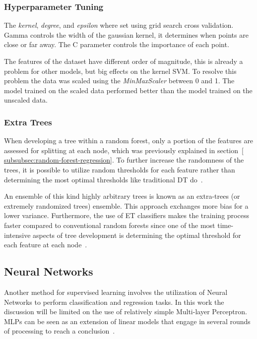 \subsubsection*{Hyperparameter Tuning}
The \textit{kernel}, \textit{degree},  and \textit{epsilon}
where set using grid
search cross validation.
Gamma controls the width of the gaussian kernel, it determines when points
are close or far away.
The C parameter controls the importance of each point.

The features of the dataset have different order of magnitude, this is
already a problem for other
models, but big effects on the kernel \ac{SVM}.
To resolve this problem the data was scaled using the \textit{MinMaxScaler}
between 0 and 1.
The model trained on the scaled data performed better than the model trained
on the unscaled data.

\subsubsection{Extra Trees}\label{subsubsec:extra-trees}
When developing a tree within a random forest, only a portion of the features are
assessed for splitting at each node, which was previously explained in section~\ref{
    subsubsec:random-forest-regression}.
To further increase the randomness of the trees,
it is possible to utilize random thresholds for each feature rather than determining the
most optimal thresholds like traditional \ac{DT} do~\cite[p. 351]{geron2022hands}.

An ensemble of this kind highly arbitrary trees is known as an extra-trees (or extremely
randomized trees) ensemble.
This approach exchanges more bias for a lower variance.
Furthermore, the use of \ac{ET} classifiers makes the training process faster
compared to conventional random forests since one of the most time-intensive aspects of
tree development is determining the optimal threshold for each feature at
each node~\cite[p. 351]{geron2022hands}.

\subsection{Neural Networks}\label{subsec:neural-networks}
Another method for supervised learning involves the utilization of Neural Networks to
perform classification and regression tasks.
In this work the discussion will be limited on the use of relatively simple Multi-layer Perceptron.
MLPs can be seen as an extension of linear models that engage in several rounds of processing to
reach a conclusion~\cite[p. 104]{muller_introductionmachinelearning_2016}.

